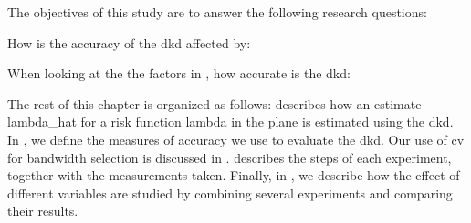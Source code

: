 The objectives of this study are to answer the following research questions:
\begin{question}
    \label{thm:accuracy-affected}
    How is the accuracy of the \gls{dkd} affected by:
\end{question}
\begin{question}
    \label{thm:accuracy-scale}
    When looking at the the factors in ,
    how accurate is the \gls{dkd}:
\end{question}

The rest of this chapter is organized as follows:
 describes how an estimate \gls{lambda_hat} for a risk function \gls{lambda} in the plane is estimated using the \gls{dkd}.
In , we define the measures of accuracy we use to evaluate the \gls{dkd}.
Our use of \gls{cv} for bandwidth selection is discussed in .
 describes the steps of each experiment, together with the measurements taken.
Finally, in , we describe how the effect of different variables are studied by combining several experiments and comparing their results.

